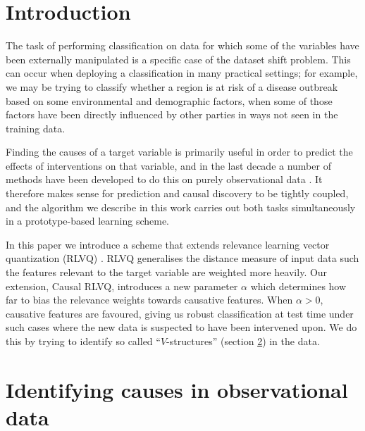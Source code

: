 \documentclass{esannV2}
\begin{document}
\section{Introduction}
\label{sec:Introduction}

The task of performing classification on data for which some of the variables have been externally manipulated is a specific case of the dataset shift problem. This can occur when deploying a classification in many practical settings; for example, we may be trying to classify whether a region is at risk of a disease outbreak based on some environmental and demographic factors, when some of those factors have been directly influenced by other parties in ways not seen in the training data.

Finding the causes of a target variable is primarily useful in order to predict the effects of interventions on that variable, and in the last decade a number of methods have been developed to do this on purely observational data \cite{06}. It therefore makes sense for prediction and causal discovery to be tightly coupled, and the algorithm we describe in this work carries out both tasks simultaneously in a prototype-based learning scheme.

In this paper we introduce a scheme that extends relevance learning vector quantization (RLVQ) \cite{08}. RLVQ generalises the distance measure of input data such the features relevant to the target variable are weighted more heavily. Our extension, Causal RLVQ, introduces a new parameter $\alpha$ which determines how far to bias the relevance weights towards causative features. When $\alpha>0$, causative features are favoured, giving us robust classification at test time under such cases where the new data is suspected to have been intervened upon. We do this by trying to identify so called ``$V$-structures'' (section \ref{sec:IdentifyingCausesInObservationalData}) in the data.



\section{Identifying causes in observational data}
\label{sec:IdentifyingCausesInObservationalData}
\end{document}
